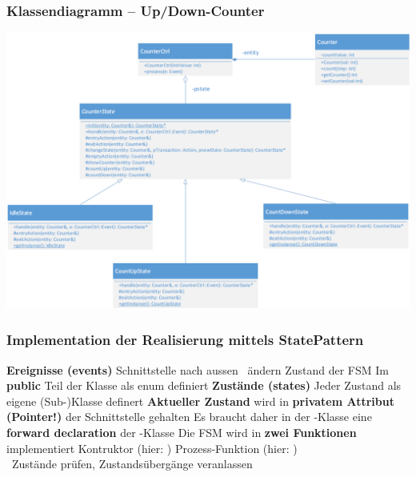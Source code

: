 \subsubsection{Klassendiagramm -- Up/Down-Counter}
\label{Klassendiagramm -- Up/Down-Counter - StatePattern}

\begin{center}
    \includegraphics[width=0.95\columnwidth]{images/fsm_up-down-counter_klassendiagramm_state_pattern.png}
\end{center}


\subsubsection{Implementation der Realisierung mittels StatePattern}

\begin{outline}
    \1 \textbf{Ereignisse (events)}
        \2 Schnittstelle nach aussen \textrightarrow\ ändern Zustand der FSM
        \2 Im \textbf{public} Teil der Klasse als enum definiert
    \1 \textbf{Zustände (states)}
        \2 Jeder Zustand als eigene (Sub-)Klasse definert
    \1 \textbf{Aktueller Zustand}  wird in \textbf{privatem Attribut (Pointer!)} der Schnittstelle gehalten
        \2 Es braucht daher in der -Klasse eine \textbf{forward declaration} der -Klasse
    \1 Die FSM wird in \textbf{zwei Funktionen} implementiert
        \2 Kontruktor (hier: )
        \2 Prozess-Funktion (hier: ) \\
            \textrightarrow\ Zustände prüfen, Zustandsübergänge veranlassen
\end{outline}


